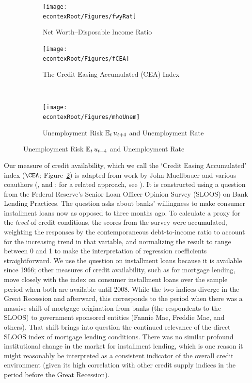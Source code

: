 \documentclass[titlepage]{\econtex}
\begin{document}
\hypertarget{fig:MainDataSeries}{}
\begin{figure}	\caption{Key Data Series} \label{fig:data}
	\centering
	\begin{subfigure}[t]{0.49\textheight}
		\centering
		{\texttt{[image: \\econtexRoot/Figures/fwyRat]}}
		\caption{Net Worth--Disposable Income Ratio}	\label{fwyRat}	
	\end{subfigure}
	\begin{subfigure}[t]{0.49\textheight}
		\centering
		{\texttt{[image: \\econtexRoot/Figures/fCEA]}}
		\caption{The Credit Easing Accumulated (CEA) Index}\label{fCEA}
	\end{subfigure} \\
	\begin{subfigure}[t]{0.49\textheight}
		\centering
		{\texttt{[image: \\econtexRoot/Figures/mhoUnem]}}
		\caption{Unemployment Risk $\operatorname{\mathbb{E}}_t u_{t+4}$ and Unemployment Rate}\label{fMho}
	\end{subfigure}
\end{figure}

Our measure of credit availability, which we call the `Credit Easing Accumulated' index ($\CEA$; Figure~\ref{fCEA}) is adapted from work by John Muellbauer and various coauthors (\cite{mue07}, \cite{ducaEtAl10_creditArch} and \cite{admmmCredit}; for a related approach, see \cite{hall:slump}).  It is constructed using a question from the Federal Reserve's Senior Loan Officer Opinion Survey (SLOOS) on Bank Lending Practices. The question asks about banks' willingness to make consumer installment loans now as opposed to three months ago. To calculate a proxy for the \emph{level} of credit conditions, the scores from the survey were accumulated, weighting the responses by the contemporaneous debt-to-income ratio to account for the increasing trend in that variable, and normalizing the result to range between 0 and 1 to make the interpretation of regression coefficients straightforward.  We use the question on installment loans because it is available since 1966; other measures of credit availability, such as for mortgage lending, move closely with the index on consumer installment loans over the sample period when both are available until 2008.  While the two indices diverge in the Great Recession and afterward, this corresponds to the period when there was a massive shift of mortgage origination from banks (the respondents to the SLOOS) to government sponsored entities (Fannie Mae, Freddie Mac, and others).  That shift brings into question the continued relevance of the direct SLOOS index of mortgage lending conditions.  There was no similar profound institutional change in the market for installment lending, which is one reason it might reasonably be interpreted as a consistent indicator of the overall credit environment (given its high correlation with other credit supply indices in the period before the Great Recession).
\end{document}
